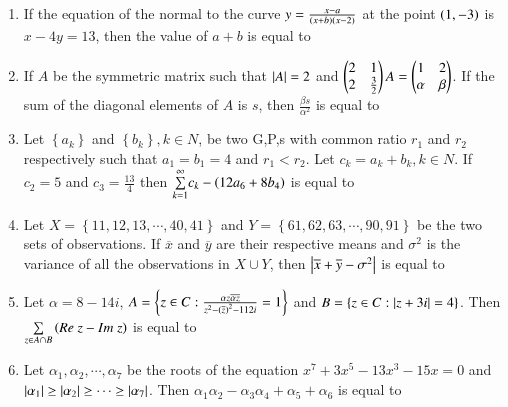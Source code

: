 \documentclass[journal]{IEEEtran}
\begin{document}
\begin{enumerate}
    \item If the equation of the normal to the curve $y=\frac{x-a}{\left(x+b\right)\left(x-2\right)}$ at the point $\left(1,-3\right)$ is $x-4y=13$, then the value of $a+b$ is equal to
        
    \item If $A$ be the symmetric matrix such that $\left\vert A\right\vert=2$ and $\begin{pmatrix}2 & 1 \\ 2 & \frac{3}{2}\end{pmatrix}A=\begin{pmatrix}1 & 2 \\ \alpha & \beta\end{pmatrix}$. If the sum of the diagonal elements of $A$ is $s$, then $\frac{\beta s}{\alpha^2}$ is equal to 

    \item Let $\left\{ a_k\right\}$ and $\left\{ b_k\right\}, k\in N$, be two G,P,s with common ratio $r_1$ and $r_2$ respectively such that $a_1=b_1=4$ and $r_1<r_2$. Let $c_k=a_k+b_k,k\in N$. If $c_2=5$ and $c_3=\frac{13}{4}$ then $\underset{k=1}{\overset{\infty}{\sum}}c_k-\left(12a_6+8b_4\right)$ is equal to
        
    \item Let $X=\left\{ 11,12,13,\cdots,40,41\right\}$ and $Y=\left\{61,62,63,\cdots,90,91\right\}$ be the two sets of observations. If $\overline{x}$ and $\overline{y}$ are their respective means and $\sigma^2$ is the variance  of all the observations in $X\cup Y$, then $\left\vert\overline{x}+\overline{y}-\sigma^2\right\vert$ is equal to

    \item Let $\alpha =8-14i$, $A=\left\{z\in C:\frac{\alpha z\overline{\alpha}\overline{z}}{z^2-\left(\overline{z}\right)^2-112i}=1\right\}$ and $B=\left\{z\in C:\left\vert z+3i\right\vert=4\right\}$. Then $\underset{z\in A\cap B}{\sum}\brak{Re\ z-Im\ z}$ is equal to

    \item Let $\alpha_1,\alpha_2,\cdots,\alpha_7$ be the roots of the equation $x^7+3x^5-13x^3-15x=0$ and $\left\vert\alpha_1\right\vert\geq\left\vert\alpha_2\right\vert\geq\cdots\geq\left\vert\alpha_7\right\vert$. Then $\alpha_1\alpha_2-\alpha_3\alpha_4+\alpha_5+\alpha_6$ is equal to

\end{enumerate}
\end{document}
